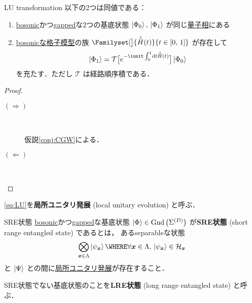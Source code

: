 \documentclass[TQFT_main]{subfiles}
\begin{document}
\begin{mypropph}[label=prop:LU]{LU transformation}
    以下の2つは同値である：
    \begin{enumerate}
        \item \hyperref[def:bosonic-lattice-model]{bosonic}かつ\hyperref[def:gapped]{gapped}な2つの基底状態 $\ket{\Phi_0},\, \ket{\Phi_1}$ が同じ\hyperref[def:quantum-phase]{量子相}にある
        \item \hyperref[def:bosonic-lattice-model]{bosonicな格子模型}の族 $\Familyset[\big]{\hat{\tilde{H}}(t)}{t \in [0,\, 1]}$ が存在して
        \begin{align}
            \label{eq:LU}
            \ket{\Phi_1} = \mathcal{T} \bigl[ e^{-\iunit \int_0^1 \dd{t} \hat{\tilde{H}}(t)} \bigr] \ket{\Phi_0}
        \end{align}
        を充たす．ただし $\mathcal{T}$ は経路順序積である．
    \end{enumerate}
\end{mypropph}

\begin{proof}
    \begin{description}
        \item[$\bm{(\Longrightarrow)}$]　
        
        仮説\ref{conj:CGW}による．

        \item[$\bm{(\Longleftarrow)}$]　
        

    \end{description}
    
\end{proof}

\eqref{eq:LU}を\textbf{局所ユニタリ発展} (local unitary evolution) と呼ぶ．

\begin{mydefph}[label=def:SRE]{SRE状態}
    \hyperref[def:bosonic-lattice-model]{bosonic}かつ\hyperref[def:gapped]{gapped}な基底状態 $\ket{\Phi} \in \mathrm{Gnd}\left(\Sigma^{(D)}\right)$ が\textbf{SRE状態} (short range entangled state) であるとは，
    あるseparableな状態
    \begin{align}
        \bigotimes_{\bm{x} \in \Lambda} \ket{\psi_{\bm{x}}} \WHERE \forall \bm{x} \in \Lambda,\, \ket{\psi_{\bm{x}}} \in \mathcal{H}_{\bm{x}}
    \end{align}
    と $\ket{\Psi}$ との間に\hyperref[prop:LU]{局所ユニタリ発展}が存在すること．
    
    \tcblower

    SRE状態でない基底状態のことを\textbf{LRE状態} (long range entangled state) と呼ぶ．
\end{mydefph}
\end{document}
